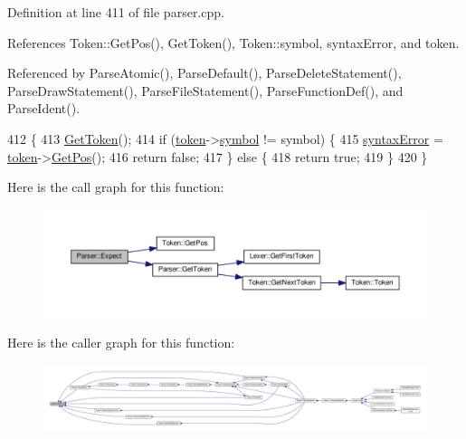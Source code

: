 Definition at line 411 of file parser.\+cpp.



References Token\+::\+Get\+Pos(), Get\+Token(), Token\+::symbol, syntax\+Error, and token.



Referenced by Parse\+Atomic(), Parse\+Default(), Parse\+Delete\+Statement(), Parse\+Draw\+Statement(), Parse\+File\+Statement(), Parse\+Function\+Def(), and Parse\+Ident().


\begin{DoxyCode}
412 \{
413     \hyperlink{classParser_a415a103e66558b4d366d9a1420561fe3}{GetToken}();
414     \textcolor{keywordflow}{if} (\hyperlink{classParser_a467028559d31c5b33f16ca8be56715cc}{token}->\hyperlink{structToken_aa671eaaae5632c5277e89a090d864820}{symbol} != symbol) \{
415         \hyperlink{classParser_ae50a199b804c9f5e8342a4d0a1ae6a95}{syntaxError} = \hyperlink{classParser_a467028559d31c5b33f16ca8be56715cc}{token}->\hyperlink{structToken_a5f93ea94940a6eeb060507e1da594599}{GetPos}();
416         \textcolor{keywordflow}{return} \textcolor{keyword}{false};
417     \} \textcolor{keywordflow}{else} \{
418         \textcolor{keywordflow}{return} \textcolor{keyword}{true};
419     \}
420 \}
\end{DoxyCode}


Here is the call graph for this function\+:
\nopagebreak
\begin{figure}[H]
\begin{center}
\leavevmode
\includegraphics[width=350pt]{d0/d40/classParser_a811765334b0cd3f01152c35c9f5bcaec_cgraph}
\end{center}
\end{figure}




Here is the caller graph for this function\+:
\nopagebreak
\begin{figure}[H]
\begin{center}
\leavevmode
\includegraphics[width=350pt]{d0/d40/classParser_a811765334b0cd3f01152c35c9f5bcaec_icgraph}
\end{center}
\end{figure}


